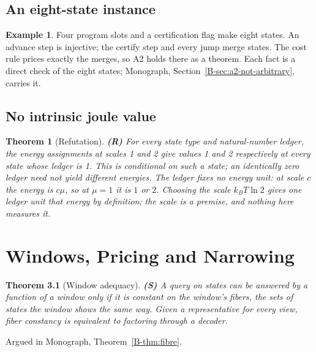 \documentclass[11pt, a4paper]{report}
\theoremstyle{definition}
\newtheorem{example}{Example}[chapter]
\theoremstyle{plain}
\newtheorem{theorem}{Theorem}[chapter]
\begin{document}
\section{An eight-state instance}

\begin{example}
Four program slots and a certification flag make eight states. An advance step is injective; the certify step and every jump merge states. The cost rule prices exactly the merges, so A2 holds there as a theorem. Each fact is a direct check of the eight states; Monograph, Section~\ref{B-sec:a2-not-arbitrary}, carries it.
\end{example}

\section{No intrinsic joule value}

\begin{theorem}[Refutation] \textbf{(R)}
For every state type and natural-number ledger, the energy assignments at scales 1 and 2 give values 1 and 2 respectively at every state whose ledger is 1. This is conditional on such a state; an identically zero ledger need not yield different energies. The ledger fixes no energy unit: at scale $c$ the energy is $c\mu$, so at $\mu = 1$ it is $1$ or $2$. Choosing the scale $k_B T \ln 2$ gives one ledger unit that energy by definition; the scale is a premise, and nothing here measures it.
\end{theorem}

\chapter{Windows, Pricing and Narrowing}\label{ch:windows}

\begin{theorem}[Window adequacy] \textbf{(S)}
A query on states can be answered by a function of a window only if it is constant on the window's fibers, the sets of states the window shows the same way. Given a representative for every view, fiber constancy is equivalent to factoring through a decoder.
\end{theorem}
\noindent Argued in Monograph, Theorem~\ref{B-thm:fibre}.
\end{document}
